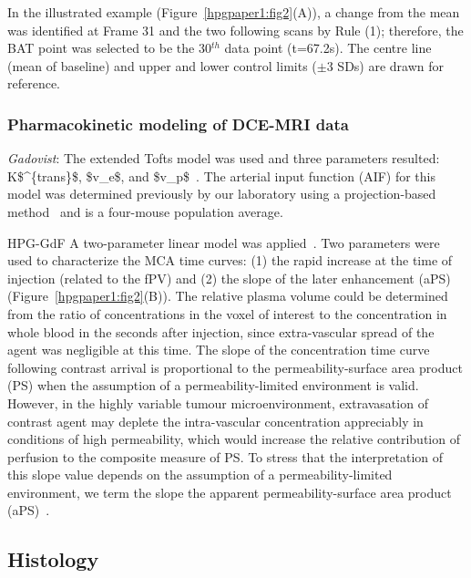 In the illustrated example (Figure~\ref{hpgpaper1:fig2}(A)), a change from the mean was identified at Frame 31 and the two following scans by Rule (1); therefore, the \acs{BAT} point was selected to be the 30$^{th}$ data point (t=67.2s).
The centre line (mean of baseline) and upper and lower control limits ($\pm$3 SDs) are drawn for reference.

\subsubsection{Pharmacokinetic modeling of DCE-MRI data}

\textit{Gadovist}: The extended Tofts model was used and three parameters resulted: \acs{K$^{trans}$}, \acs{$v_e$}, and \acs{$v_p$}~\cite{Sourbron:2011ce}.
The arterial input function (AIF) for this model was determined previously by our laboratory using a projection-based method~\cite{Moroz:2013ee} and is a four-mouse population average.

\acs{HPG-GdF} A two-parameter linear model was applied~\cite{Pathak:2005gu}.
Two parameters were used to characterize the \acs{MCA} time curves: (1) the rapid increase at the time of injection (related to the \acs{fPV}) and (2) the slope of the later enhancement (\acs{aPS}) (Figure~\ref{hpgpaper1:fig2}(B)).
The relative plasma volume could be determined from the ratio of concentrations in the voxel of interest to the concentration in whole blood in the seconds after injection, since extra-vascular spread of the agent was negligible at this time.
The slope of the concentration time curve following contrast arrival is proportional to the permeability-surface area product (\acs{PS}) when the assumption of a permeability-limited environment is valid.
However, in the highly variable tumour microenvironment, extravasation of contrast agent may deplete the intra-vascular concentration appreciably in conditions of high permeability, which would increase the relative contribution of perfusion to the composite measure of \acs{PS}.
To stress that the interpretation of this slope value depends on the assumption of a permeability-limited environment, we term the slope the apparent permeability-surface area product (\acs{aPS})~\cite{DaldrupLink:2004gy,Dafni:2002kb}.

\subsection{Histology}

